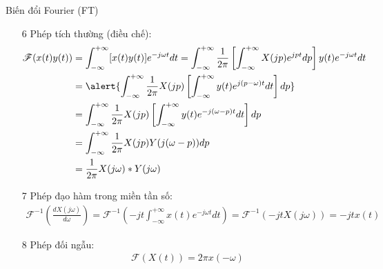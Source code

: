\documentclass[8pt]{beamer}
\begin{document}
\begin{frame}{Biến đổi Fourier (FT)}
\begin{enumerate}
\item[6] Phép tích thường (điều chế):
\begin{equation*}
\begin{split}
	\mathscr{F}(x(t)y(t))&=\int_{-\infty}^{+\infty}[x(t)y(t)]e^{-j\omega t}dt=\int_{-\infty}^{+\infty}\frac{1}{2\pi}\left[\int_{-\infty}^{+\infty}X(jp)e^{jpt}dp\right]y(t)e^{-j\omega t}dt\\
			     &=\alert{\int_{-\infty}^{+\infty}\frac{1}{2\pi}X(jp)\left[\int_{-\infty}^{+\infty}y(t)e^{j(p-\omega)t} dt\right]dp}\\
			     &=\int_{-\infty}^{+\infty}\frac{1}{2\pi}X(jp)\left[\int_{-\infty}^{+\infty}y(t)e^{-j(\omega-p)t} dt\right]dp\\
			     &=\int_{-\infty}^{+\infty}\frac{1}{2\pi}X(jp)Y(j(\omega-p))dp\\
			     &=\frac{1}{2\pi}X(j\omega)*Y(j\omega)
\end{split}
\end{equation*}
\item[7] Phép đạo hàm trong miền tần số:
	\begin{equation*}
	\begin{split}
		\mathscr{F}^{-1}\left(\frac{dX(j\omega)}{d\omega}\right)=\mathscr{F}^{-1}\left(-jt\int_{-\infty}^{+\infty}x(t)e^{-j\omega t}dt\right)=\mathscr{F}^{-1}(-jtX(j\omega))=-jtx(t)
	\end{split}
\end{equation*}
\item[8] Phép đối ngẫu: 
\begin{equation*}
\begin{split}
\mathscr{F}(X(t))=2\pi x(-\omega)
\end{split}
\end{equation*}
\end{enumerate}
\end{frame}
\end{document}
